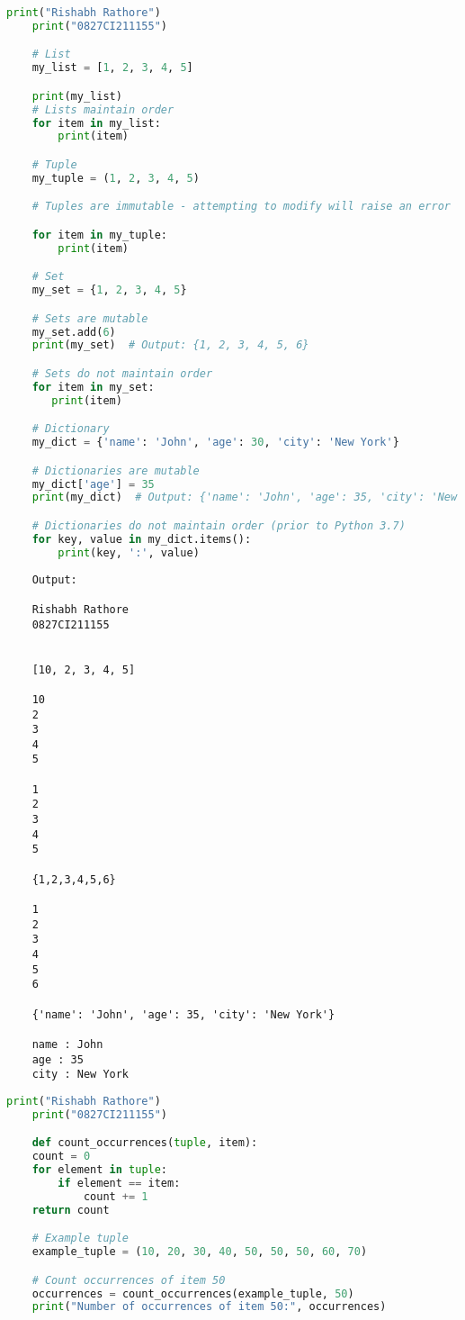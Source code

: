 \documentclass{report}
\begin{document}
\sol 
\begin{lstlisting}[language=Python]
	print("Rishabh Rathore")
	print("0827CI211155")

	# List
	my_list = [1, 2, 3, 4, 5]

	print(my_list)
	# Lists maintain order
	for item in my_list:
    	print(item)

	# Tuple
	my_tuple = (1, 2, 3, 4, 5)

	# Tuples are immutable - attempting to modify will raise an error

	for item in my_tuple:
    	print(item)

	# Set
	my_set = {1, 2, 3, 4, 5}

	# Sets are mutable
	my_set.add(6)
	print(my_set)  # Output: {1, 2, 3, 4, 5, 6}

	# Sets do not maintain order
	for item in my_set:
 	   print(item)

	# Dictionary
	my_dict = {'name': 'John', 'age': 30, 'city': 'New York'}

	# Dictionaries are mutable
	my_dict['age'] = 35
	print(my_dict)  # Output: {'name': 'John', 'age': 35, 'city': 'New York'}

	# Dictionaries do not maintain order (prior to Python 3.7)
	for key, value in my_dict.items():
    	print(key, ':', value)


\end{lstlisting}

\begin{verbatim}
	Output:

	Rishabh Rathore
	0827CI211155


	[10, 2, 3, 4, 5]

	10
	2
	3
	4
	5

	1
	2
	3
	4
	5

	{1,2,3,4,5,6}

	1
	2
	3
	4
	5
	6

	{'name': 'John', 'age': 35, 'city': 'New York'}

	name : John
	age : 35
	city : New York

\end{verbatim}



\newpage

\sol 
\begin{lstlisting}[language=Python]
	print("Rishabh Rathore")
	print("0827CI211155")

	def count_occurrences(tuple, item):
    count = 0
    for element in tuple:
        if element == item:
            count += 1
    return count

	# Example tuple
	example_tuple = (10, 20, 30, 40, 50, 50, 50, 60, 70)

	# Count occurrences of item 50
	occurrences = count_occurrences(example_tuple, 50)
	print("Number of occurrences of item 50:", occurrences)


\end{lstlisting}
\end{document}
